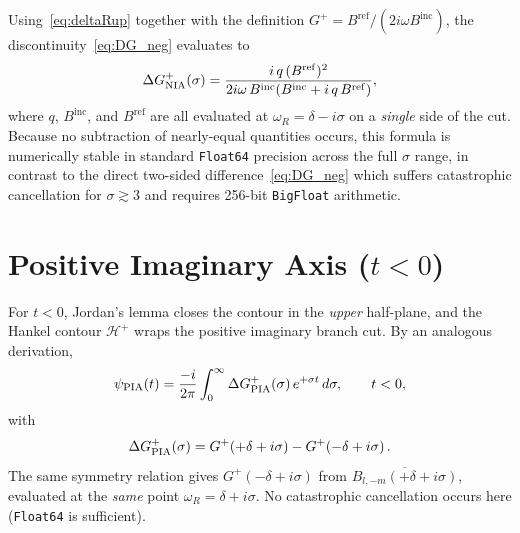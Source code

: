 \documentclass[12pt,a4paper]{article}
\newcommand{\Binc}{B^{\mathrm{inc}}}
\newcommand{\Bref}{B^{\mathrm{ref}}}
\begin{document}
Using~\eqref{eq:deltaRup} together with the definition $G^+ = \Bref/(2i\omega\Binc)$,
the discontinuity~\eqref{eq:DG_neg} evaluates to~\cite{Casals2016}
\begin{equation}
  \Delta G^+_{\rm NIA}(\sigma) = \frac{i\,q\,(\Bref)^2}
      {2i\omega\,\Binc\!\left(\Binc + i\,q\,\Bref\right)},
  \label{eq:DGneg_q}
\end{equation}
where $q$, $\Binc$, and $\Bref$ are all evaluated at $\omega_R = \delta - i\sigma$
on a \emph{single} side of the cut.
Because no subtraction of nearly-equal quantities occurs, this formula is
numerically stable in standard \texttt{Float64} precision across the full
$\sigma$ range, in contrast to the direct two-sided difference~\eqref{eq:DG_neg}
which suffers catastrophic cancellation for $\sigma \gtrsim 3$ and requires
256-bit \texttt{BigFloat} arithmetic.

\section{Positive Imaginary Axis (\texorpdfstring{$t<0$}{t<0})}

For $t<0$, Jordan's lemma closes the contour in the \emph{upper}
half-plane, and the Hankel contour $\mathcal{H}^+$ wraps the positive
imaginary branch cut.
By an analogous derivation,
\begin{equation}
    \psi_{\mathrm{PIA}}(t) = \frac{-i}{2\pi}
    \int_0^{\infty} \Delta G^+_{\rm PIA}(\sigma)\,e^{+\sigma t}\,d\sigma,
    \qquad t < 0,
  \label{eq:BC_pos}
\end{equation}
with
\begin{equation}
  \Delta G^+_{\rm PIA}(\sigma)
  = G^+\!\left(+\delta + i\sigma\right) - G^+\!\left(-\delta + i\sigma\right).
  \label{eq:DG_pos}
\end{equation}
The same symmetry relation gives $G^+(-\delta+i\sigma)$ from
$\overline{B_{l,-m}(+\delta+i\sigma)}$, evaluated at the \emph{same} point
$\omega_R = \delta + i\sigma$.
No catastrophic cancellation occurs here (\texttt{Float64} is sufficient).
\end{document}
